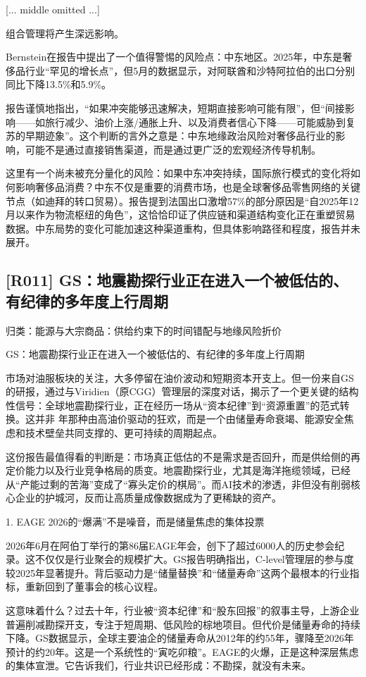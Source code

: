 \documentclass[11pt]{ctexart}
\begin{document}
[... middle omitted ...]

组合管理将产生深远影响。

Bernstein在报告中提出了一个值得警惕的风险点：中东地区。2025年，中东是奢侈品行业“罕见的增长点”，但5月的数据显示，对阿联酋和沙特阿拉伯的出口分别同比下降13.5\%和5.9\%。

报告谨慎地指出，“如果冲突能够迅速解决，短期直接影响可能有限”，但“间接影响——如旅行减少、油价上涨/通胀上升、以及消费者信心下降——可能威胁到复苏的早期迹象”。这个判断的言外之意是：中东地缘政治风险对奢侈品行业的影响，可能不是通过直接销售渠道，而是通过更广泛的宏观经济传导机制。

这里有一个尚未被充分量化的风险：如果中东冲突持续，国际旅行模式的变化将如何影响奢侈品消费？中东不仅是重要的消费市场，也是全球奢侈品零售网络的关键节点（如迪拜的转口贸易）。报告提到法国出口激增57\%的部分原因是“自2025年12月以来作为物流枢纽的角色”，这恰恰印证了供应链和渠道结构变化正在重塑贸易数据。中东局势的变化可能加速这种渠道重构，但具体影响路径和程度，报告并未展开。

\subsection{[R011] GS：地震勘探行业正在进入一个被低估的、有纪律的多年度上行周期}
{\small\color{refgray}归类：能源与大宗商品：供给约束下的时间错配与地缘风险折价}

GS：地震勘探行业正在进入一个被低估的、有纪律的多年度上行周期

市场对油服板块的关注，大多停留在油价波动和短期资本开支上。但一份来自GS的研报，通过与Viridien（原CGG）管理层的深度对话，揭示了一个更关键的结构性信号：全球地震勘探行业，正在经历一场从“资本纪律”到“资源重置”的范式转换。这并非 年那种由高油价驱动的狂欢，而是一个由储量寿命衰竭、能源安全焦虑和技术壁垒共同支撑的、更可持续的周期起点。

这份报告最值得看的判断是：市场真正低估的不是需求是否回升，而是供给侧的再定价能力以及行业竞争格局的质变。地震勘探行业，尤其是海洋拖缆领域，已经从“产能过剩的苦海”变成了“寡头定价的棋局”。而AI技术的渗透，非但没有削弱核心企业的护城河，反而让高质量成像数据成为了更稀缺的资产。

1. EAGE 2026的“爆满”不是噪音，而是储量焦虑的集体投票

2026年6月在阿伯丁举行的第86届EAGE年会，创下了超过6000人的历史参会纪录。这不仅仅是行业聚会的规模扩大。GS报告明确指出，C-level管理层的参与度较2025年显著提升。背后驱动力是“储量替换”和“储量寿命”这两个最根本的行业指标，重新回到了董事会的核心议程。

这意味着什么？过去十年，行业被“资本纪律”和“股东回报”的叙事主导，上游企业普遍削减勘探开支，专注于短周期、低风险的棕地项目。但代价是储量寿命的持续下降。GS数据显示，全球主要油企的储量寿命从2012年的约55年，骤降至2026年预计的约20年。这是一个系统性的“寅吃卯粮”。EAGE的火爆，正是这种深层焦虑的集体宣泄。它告诉我们，行业共识已经形成：不勘探，就没有未来。
\end{document}
